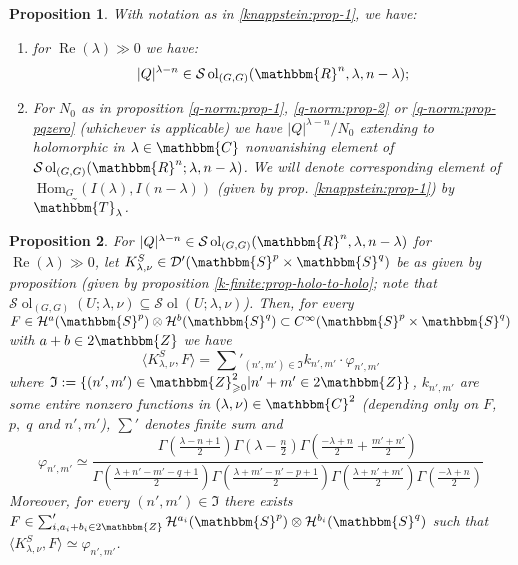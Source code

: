 \documentclass{article}
\newcommand{\assign}{:=}
\newcommand{\tmop}[1]{\ensuremath{\operatorname{#1}}}
\numberwithin{definition}{section}
\numberwithin{lemma}{section}
\newtheorem{proposition}{Proposition}
\numberwithin{proposition}{section}
{\theorembodyfont{\rmfamily}\newtheorem{remark}{Remark}
\numberwithin{remark}{section}
}
\begin{document}
\begin{proposition}
  \label{knappstein:prop-holo}With notation as in \ref{knappstein:prop-1}, we
  have:
  \begin{enumerate}
    \item for $\tmop{Re} ( \lambda) \gg 0$ we have:
    \[ | Q |^{\lambda - n} \in \mathcal{S} \tmop{ol}_{( G, G)} (
       \mathbbm{R}^n, \lambda, n - \lambda) ; \]
    \item For $N_0$ as in proposition \ref{q-norm:prop-1}, \ref{q-norm:prop-2}
    or \ref{q-norm:prop-pqzero} (whichever is applicable) we have $| Q
    |^{\lambda - n} / N_0$ extending to holomorphic in $\lambda \in
    \mathbbm{C}$ nonvanishing element of $\mathcal{S} \tmop{ol}_{( G, G)} (
    \mathbbm{R}^n ; \lambda, n - \lambda)$. We will denote corresponding
    element of $\tmop{Hom}_G ( I ( \lambda), I ( n - \lambda))$ (given by
    prop. \ref{knappstein:prop-1}) by $\tilde{\mathbbm{T}}_{\lambda}$.
  \end{enumerate}
\end{proposition}

\begin{proposition}
  \label{knappstein:prop-kfinite}For $| Q |^{\lambda - n} \in \mathcal{S}
  \tmop{ol}_{( G, G)} ( \mathbbm{R}^n, \lambda, n - \lambda)$ for $\tmop{Re} (
  \lambda) \gg 0$, let $K_{\lambda, \nu}^S \in \mathcal{D}' ( \mathbbm{S}^p
  \times \mathbbm{S}^q)$ be as given by proposition (given by proposition
  \ref{k-finite:prop-holo-to-holo}; note that $\mathcal{S} \tmop{ol}_{( G, G)}
  ( U ; \lambda, \nu) \subseteq \mathcal{S} \tmop{ol} ( U ; \lambda, \nu)$).
  Then, for every $F \in \mathcal{H}^a ( \mathbbm{S}^p) \otimes \mathcal{H}^b
  ( \mathbbm{S}^q) \subset C^{\infty} ( \mathbbm{S}^p \times \mathbbm{S}^q)$
  with $a + b \in 2\mathbbm{Z}$ we have
  \begin{equation}
    \langle K^S_{\lambda, \nu}, F \rangle = \sum'_{( n', m') \in \mathfrak{I}}
    k_{n', m'} \cdot \varphi_{n', m'}
  \end{equation}
  where $\mathfrak{I} \assign \{ ( n', m') \in \mathbbm{Z}_{\geqslant 0}^2 |
  n' + m' \in 2\mathbbm{Z} \}$, $k_{n', m'}$ are some entire nonzero functions
  in $( \lambda, \nu) \in \mathbbm{C}^2$ (depending only on $F$, $p, \; q$ and
  $n', m'$), $\sum'$ denotes finite sum and
  \[ \varphi_{n',m'}\simeq \frac{\Gamma \left( \frac{\lambda - n + 1}{2} \right) \Gamma
     \left( \lambda - \frac{n}{2} \right) \Gamma \left( \frac{- \lambda +
     n}{2} + \frac{m' + n'}{2} \right)}{\Gamma \left( \frac{\lambda + n' - m'
     - q + 1}{2} \right) \Gamma \left( \frac{\lambda + m' - n' - p + 1}{2}
     \right) \Gamma \left( \frac{\lambda + n' + m'}{2} \right) \Gamma \left(
     \frac{- \lambda + n}{2} \right)} \]
  Moreover, for every $( n', m') \in \mathfrak{I}$ there exists $F \in
  \sum_{i, a_i + b_i \in 2\mathbbm{Z}}' \mathcal{H}^{a_i} ( \mathbbm{S}^p)
  \otimes \mathcal{H}^{b_i} ( \mathbbm{S}^q)$ such that $\langle K_{\lambda,
  \nu}^S, F \rangle \simeq \varphi_{n', m'}$.
\end{proposition}
\end{document}
